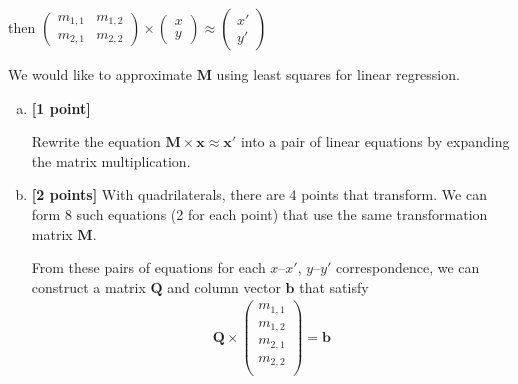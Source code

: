 then $\begin{pmatrix} m_{1,1} & m_{1,2} \\ m_{2,1} & m_{2,2} \end{pmatrix} \times \begin{pmatrix} x \\ y \end{pmatrix} \approx \begin{pmatrix} x' \\ y'  \end{pmatrix}$

We would like to approximate $\mathbf{M}$ using least squares for linear regression.

\begin{enumerate}[(a)]
\item \textbf{[1 point]} 
\begin{tcolorbox}[colback=orange!5!white,colframe=orange!75!black]
Rewrite the equation $\mathbf{M} \times \mathbf{x} \approx \mathbf{x'}$ into a pair of linear equations by expanding the matrix multiplication.
\end{tcolorbox}


\pagebreak
\item \textbf{[2 points]}
With quadrilaterals, there are 4 points that transform. We can form 8 such equations (2 for each point) that use the same transformation matrix $\mathbf{M}$.

From these pairs of equations for each $x$--$x'$, $y$--$y'$ correspondence, we can construct a matrix $\mathbf{Q}$ and column vector $\mathbf{b}$ that satisfy
\begin{align*}
    \mathbf{Q} \times \begin{pmatrix} m_{1,1} \\ m_{1,2} \\ m_{2,1} \\ m_{2,2} \\ \end{pmatrix} = \mathbf{b}
\end{align*}


\end{enumerate}
